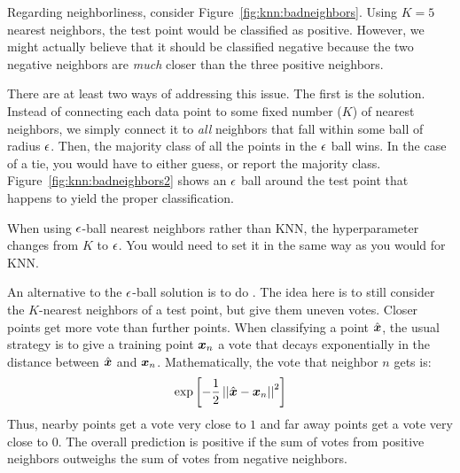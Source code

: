 
Regarding neighborliness, consider Figure~\ref{fig:knn:badneighbors}.
Using $K=5$ nearest neighbors, the test point would be classified as
positive.  However, we might actually believe that it should be
classified negative because the two negative neighbors are \emph{much}
closer than the three positive neighbors.


There are at least two ways of addressing this issue.  The first is
the  solution.  Instead of connecting each data
point to some fixed number ($K$) of nearest neighbors, we simply
connect it to \emph{all} neighbors that fall within some ball of
radius $\epsilon$.  Then, the majority class of all the points in the $\epsilon$
ball wins.  In the case of a tie, you would have to either guess, or
report the majority class.  Figure~\ref{fig:knn:badneighbors2} shows an
$\epsilon$ ball around the test point that happens to yield the proper
classification.

When using $\epsilon$-ball nearest neighbors rather than KNN, the
hyperparameter changes from $K$ to $\epsilon$.  You would need to set it in
the same way as you would for KNN.


An alternative to the $\epsilon$-ball solution is to do .  The idea here is to still consider the
$K$-nearest neighbors of a test point, but give them uneven votes.
Closer points get more vote than further points.  When classifying a
point $\hat{{\boldsymbol{x}}}$, the usual strategy is to give a training point
${\boldsymbol{x}}_n$ a vote that decays exponentially in the distance between
$\hat{{\boldsymbol{x}}}$ and ${\boldsymbol{x}}_n$.  Mathematically, the vote that neighbor $n$
gets is:
\begin{equation} \label{eq:expdecay}
\exp\left[ - \frac 1 2 \norm{\hat\vx - \vx_n}^2 \right]
\end{equation}
Thus, nearby points get a vote very close to $1$ and far away points
get a vote very close to $0$.  The overall prediction is positive if
the sum of votes from positive neighbors outweighs the sum of votes
from negative neighbors.


